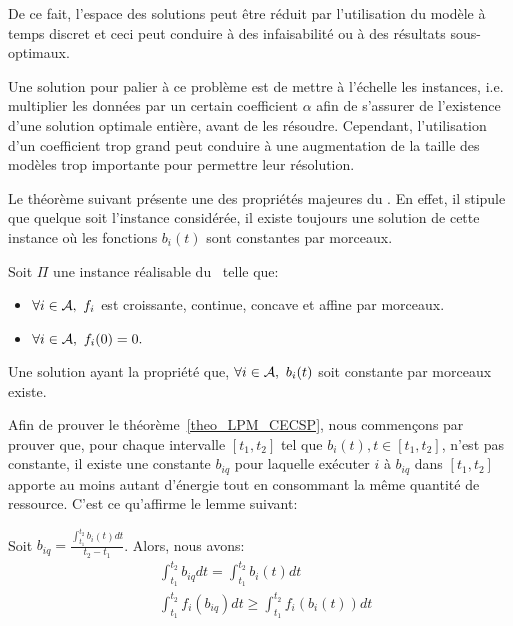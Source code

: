 De ce fait, l'espace des solutions peut être réduit par l'utilisation
du modèle à temps discret et ceci peut conduire à des infaisabilité ou
à des résultats sous-optimaux.

Une solution pour palier à ce problème est de mettre à l'échelle les
instances, i.e. multiplier les données par un certain coefficient $\alpha$
afin de s'assurer de l'existence d'une solution optimale entière,
avant de les résoudre. Cependant, l'utilisation d'un coefficient trop
grand peut conduire à une augmentation de la taille des modèles trop
importante pour permettre leur résolution. 


Le théorème suivant présente une des propriétés majeures du \CECSP. En
effet, il stipule que quelque soit l'instance considérée, il existe
toujours une solution de cette instance où les fonctions $b_i(t)$ sont
constantes par morceaux. 

\begin{theo}
\label{theo_LPM_CECSP}
Soit $\Pi$ une instance réalisable du \CECSP~telle que:
\begin{itemize}
\item $\forall i \in {\cal A},\ f_i$ est croissante, continue, concave et
  affine par morceaux. 
\item $\forall i \in \A,\ f_i(0)=0.$
\end{itemize}
Une solution ayant la propriété que, $\forall i \in {\cal A},\ b_i(t)$ soit
constante par morceaux existe.
\end{theo}

Afin de prouver le théorème~\ref{theo_LPM_CECSP}, nous commençons par
prouver que, pour chaque intervalle $[t_1,t_2]$ tel que $b_i(t), t \in
[t_1,t_2]$, n'est pas constante, il existe une constante $b_{iq}$ pour
laquelle exécuter $i$ à $b_{iq}$ dans $[t_1,t_2]$ apporte au moins
autant d'énergie tout en consommant la même quantité de
ressource. C'est ce qu'affirme le lemme suivant:

\begin{lemma}
\label{lemmaEn}
Soit $b_{iq}= \frac{\int_{t_1}^{t_2}b_i(t)dt}{t_2-t_1}$. Alors, nous
avons:
\begin{align}
  &\int_{t_1}^{t_2}b_{iq}dt = \int_{t_1}^{t_2} b_i(t) dt \label{eq_LPM_res} \\
  & \int_{t_1}^{t_2}f_i(b_{iq})dt \ge \int_{t_1}^{t_2} f_i(b_i(t)) dt 
    \label{eq_LPM_nrj}
\end{align}
\end{lemma}

